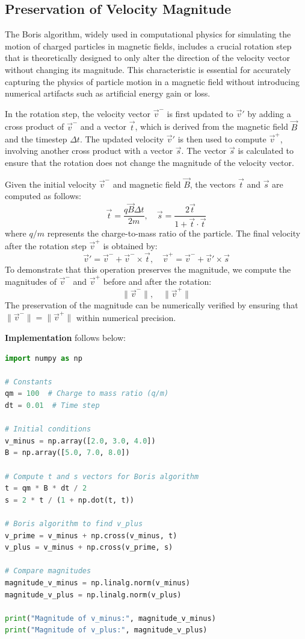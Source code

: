 \documentclass{article}
\begin{document}
\subsection{Preservation of Velocity Magnitude}

The Boris algorithm, widely used in computational physics for simulating the motion of charged particles in magnetic fields, includes a crucial rotation step that is theoretically designed to only alter the direction of the velocity vector without changing its magnitude. This characteristic is essential for accurately capturing the physics of particle motion in a magnetic field without introducing numerical artifacts such as artificial energy gain or loss.

In the rotation step, the velocity vector $\vec{v}^-$ is first updated to $\vec{v}'$ by adding a cross product of $\vec{v}^-$ and a vector $\vec{t}$, which is derived from the magnetic field $\vec{B}$ and the timestep $\Delta t$. The updated velocity $\vec{v}'$ is then used to compute $\vec{v}^+$, involving another cross product with a vector $\vec{s}$. The vector $\vec{s}$ is calculated to ensure that the rotation does not change the magnitude of the velocity vector.

Given the initial velocity $\vec{v}^-$ and magnetic field $\vec{B}$, the vectors $\vec{t}$ and $\vec{s}$ are computed as follows:
\[
\vec{t} = \frac{q \vec{B} \Delta t}{2m}, \quad \vec{s} = \frac{2 \vec{t}}{1 + \vec{t} \cdot \vec{t}}
\]
where $q/m$ represents the charge-to-mass ratio of the particle. The final velocity after the rotation step $\vec{v}^+$ is obtained by:
\[
\vec{v}' = \vec{v}^- + \vec{v}^- \times \vec{t}, \quad \vec{v}^+ = \vec{v}^- + \vec{v}' \times \vec{s}
\]
To demonstrate that this operation preserves the magnitude, we compute the magnitudes of $\vec{v}^-$ and $\vec{v}^+$ before and after the rotation:
\[
\|\vec{v}^-\|, \quad \|\vec{v}^+\|
\]
The preservation of the magnitude can be numerically verified by ensuring that $\|\vec{v}^-\| = \|\vec{v}^+\|$ within numerical precision.
\vspace{3mm}

\textbf{Implementation} follows below:

\begin{lstlisting}[language=python]
import numpy as np

# Constants
qm = 100  # Charge to mass ratio (q/m)
dt = 0.01  # Time step

# Initial conditions
v_minus = np.array([2.0, 3.0, 4.0])
B = np.array([5.0, 7.0, 8.0])

# Compute t and s vectors for Boris algorithm
t = qm * B * dt / 2
s = 2 * t / (1 + np.dot(t, t))

# Boris algorithm to find v_plus
v_prime = v_minus + np.cross(v_minus, t)
v_plus = v_minus + np.cross(v_prime, s)

# Compare magnitudes
magnitude_v_minus = np.linalg.norm(v_minus)
magnitude_v_plus = np.linalg.norm(v_plus)

print("Magnitude of v_minus:", magnitude_v_minus)
print("Magnitude of v_plus:", magnitude_v_plus)
\end{lstlisting}
\end{document}
